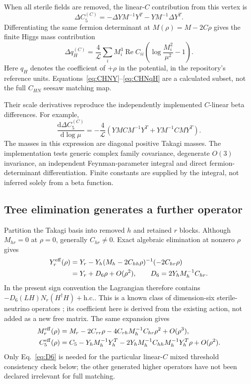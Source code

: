 \documentclass[11pt]{article}
\newcommand{\dd}{\mathrm d}
\newcommand{\LOOP}{\mathcal L}
\begin{document}
When all sterile fields are removed, the linear-$C$ contribution from
this vertex is
\begin{equation}
 \Delta C_5^{(C)}=-\Delta Y M^{-1}Y^T-YM^{-1}\Delta Y^T.
 \label{eq:CHNC5}
\end{equation}
Differentiating the same fermion determinant at $M(\rho)=M-2C\rho$ gives
the finite Higgs mass contribution
\begin{equation}
 \Delta q_H^{(C)}=\frac4{\LOOP}\sum_i M_i^3\operatorname{Re}C_{ii}
               \left(\log\frac{M_i^2}{\mu^2}-1\right).
 \label{eq:CHNqH}
\end{equation}
Here $q_H$ denotes the coefficient of $+\rho$ in the potential, in the
repository's reference units. Equations~\eqref{eq:CHNY}--\eqref{eq:CHNqH}
are a calculated subset, not the full $C_{HN}$ seesaw matching map.

Their scale derivatives reproduce the independently implemented
$C$-linear beta differences. For example,
\begin{equation}
 \frac{\dd\Delta C_5^{(C)}}{\dd\log\mu}
 =-\frac4{\LOOP}
 \left(YMC M^{-1}Y^T+YM^{-1}CMY^T\right).
 \label{eq:CHNRG}
\end{equation}
The masses in this expression are diagonal positive Takagi masses.
The implementation tests generic complex family covariance, degenerate
$O(3)$ invariance, an independent Feynman-parameter integral and direct
fermion-determinant differentiation. Finite constants are supplied by
the integral, not inferred solely from a beta function.

\subsection{Tree elimination generates a further operator}
Partition the Takagi basis into removed $h$ and retained $r$ blocks.
Although $M_{hr}=0$ at $\rho=0$, generally $C_{hr}\ne0$. Exact algebraic
elimination at nonzero $\rho$ gives
\begin{align}
 Y_r^{\rm eff}(\rho)
 &=Y_r-Y_h(M_h-2C_{hh}\rho)^{-1}(-2C_{hr}\rho)\\
 &=Y_r+D_6\rho+O(\rho^2),\qquad
 D_6=2Y_hM_h^{-1}C_{hr}.
 \label{eq:D6}
\end{align}
In the present sign convention the Lagrangian therefore contains
$-D_6(LH)N_r(H^\dagger H)+\mathrm{h.c.}$.
This is a known class of dimension-six sterile-neutrino operators
\cite{basis}; its coefficient here is derived from the existing action,
not added as a new free matrix. The same expansion gives
\begin{align}
 M_r^{\rm eff}(\rho)&=M_r-2C_{rr}\rho
              -4C_{rh}M_h^{-1}C_{hr}\rho^2+O(\rho^3),\\
 C_5^{\rm eff}(\rho)&=C_5-Y_hM_h^{-1}Y_h^T
              -2Y_hM_h^{-1}C_{hh}M_h^{-1}Y_h^T\rho+O(\rho^2).
\end{align}
Only Eq.~\eqref{eq:D6} is needed for the particular linear-$C$ mixed
threshold consistency check below; the other generated higher operators
have not been declared irrelevant for full matching.
\end{document}
